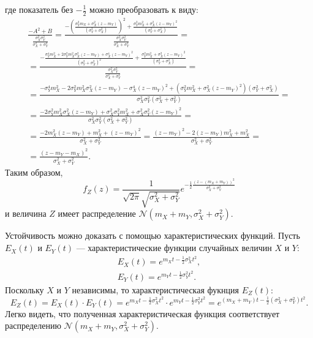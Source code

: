где показатель без $-\frac{1}{2}$ можно преобразовать к виду:
\begin{multline}
    \frac{- A^2 + B}{\frac{\sigma_X^2 \sigma_Y^2}{\sigma_X^2 + \sigma_Y^2}}
    = \frac{- \left ( \frac{\sigma_Y^2 m_X + \sigma_X^2 (z - m_Y)}{(\sigma_Y^2 + \sigma_X^2)} \right )^2 + \frac{\sigma_Y^2 m_X^2 + \sigma_X^2 (z - m_Y)^2}{(\sigma_Y^2 + \sigma_X^2)}}{\frac{\sigma_X^2 \sigma_Y^2}{\sigma_X^2 + \sigma_Y^2}} = \\
    = \frac{- \frac{\sigma_Y^4 m_X^2 + 2 \sigma_Y^2 m_X^2 \sigma_X^2 (z - m_Y) + \sigma_X^4 (z - m_Y)^2}{(\sigma_Y^2 + \sigma_X^2)^2} + \frac{\sigma_Y^2 m_X^2 + \sigma_X^2 (z - m_Y)^2}{(\sigma_Y^2 + \sigma_X^2)}}{\frac{\sigma_X^2 \sigma_Y^2}{\sigma_X^2 + \sigma_Y^2}} = \\
    = \frac{- \sigma_Y^4 m_X^2 - 2 \sigma_Y^2 m_X^2 \sigma_X^2 (z - m_Y) - \sigma_X^4 (z - m_Y)^2 + \left ( \sigma_Y^2 m_X^2 + \sigma_X^2 (z - m_Y)^2 \right ) (\sigma_Y^2 + \sigma_X^2)}{\sigma_X^2 \sigma_Y^2 \left ( \sigma_X^2 + \sigma_Y^2 \right )} = \\
    = \frac{- 2 \sigma_Y^2 m_X^2 \sigma_X^2 (z - m_Y) + \sigma_X^2 \sigma_Y^2 m_X^2 + \sigma_X^2 \sigma_Y^2 (z - m_Y)^2}{\sigma_X^2 \sigma_Y^2 \left ( \sigma_X^2 + \sigma_Y^2 \right )} = \\
    = \frac{- 2 m_X^2 (z - m_Y) + m_X^2 + (z - m_Y)^2}{\sigma_X^2 + \sigma_Y^2}
    = \frac{(z - m_Y)^2 - 2 (z - m_Y) m_X^2 + m_X^2}{\sigma_X^2 + \sigma_Y^2} = \\
    = \frac{(z - m_Y - m_X)^2}{\sigma_X^2 + \sigma_Y^2} .
\end{multline}
Таким образом,
\begin{equation}
    f_Z(z)
    = \frac{1}{\sqrt{2 \pi} \sqrt{\sigma_X^2 + \sigma_Y^2}} e^{ -\frac{1}{2} \frac{(z - (m_X + m_Y))^2}{\sigma_X^2 + \sigma_Y^2}}
\end{equation}
и величина $Z$ имеет распределение $\mathcal{N} \left ( m_X + m_Y, \sigma_X^2 + \sigma_Y^2 \right )$.

Устойчивость можно доказать с помощью характеристических функций. Пусть $E_X(t)$ и $E_Y(t)$ --- характеристические функции случайных величин $X$ и $Y$:
\begin{gather}
    E_X(t) =  e^{m_X t - \frac{1}{2} \sigma_X^2 t^2} , \\
    E_Y(t) =  e^{m_Y t - \frac{1}{2} \sigma_Y^2 t^2} .
\end{gather}
Поскольку $X$ и $Y$ независимы, то характеристическая фукнция $E_Z(t)$:
\begin{equation}
    E_Z(t)
    = E_X(t) \cdot E_Y(t)
    = e^{m_X t - \frac{1}{2} \sigma_X^2 t^2} \cdot e^{m_Y t - \frac{1}{2} \sigma_Y^2 t^2}
    = e^{\left ( m_X + m_Y \right ) t - \frac{1}{2} \left ( \sigma_X^2 + \sigma_Y^2 \right ) t^2} .
\end{equation}
Легко видеть, что полученная характеристическая функция соответствует распределению $\mathcal{N} \left ( m_X + m_Y, \sigma_X^2 + \sigma_Y^2 \right )$.

